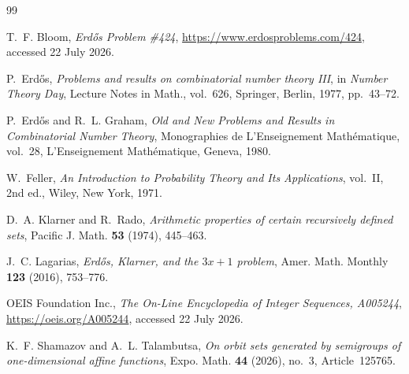 \documentclass[11pt,a4paper]{amsart}
\begin{document}
\begin{thebibliography}{99}

T.~F. Bloom,
\emph{Erd\H{o}s Problem \#424},
\url{https://www.erdosproblems.com/424}, accessed 22 July 2026.

P.~Erd\H{o}s,
\emph{Problems and results on combinatorial number theory III},
in \emph{Number Theory Day}, Lecture Notes in Math., vol.~626,
Springer, Berlin, 1977, pp.~43--72.

P.~Erd\H{o}s and R.~L. Graham,
\emph{Old and New Problems and Results in Combinatorial Number Theory},
Monographies de L'Enseignement Math\'ematique, vol.~28,
L'Enseignement Math\'ematique, Geneva, 1980.

W.~Feller,
\emph{An Introduction to Probability Theory and Its Applications}, vol.~II,
2nd ed., Wiley, New York, 1971.

D.~A. Klarner and R.~Rado,
\emph{Arithmetic properties of certain recursively defined sets},
Pacific J. Math. \textbf{53} (1974), 445--463.

J.~C. Lagarias,
\emph{Erd\H{o}s, Klarner, and the $3x+1$ problem},
Amer. Math. Monthly \textbf{123} (2016), 753--776.

OEIS Foundation Inc.,
\emph{The On-Line Encyclopedia of Integer Sequences, A005244},
\url{https://oeis.org/A005244}, accessed 22 July 2026.

K.~F. Shamazov and A.~L. Talambutsa,
\emph{On orbit sets generated by semigroups of one-dimensional affine functions},
Expo. Math. \textbf{44} (2026), no.~3, Article~125765.

\end{thebibliography}
\end{document}
